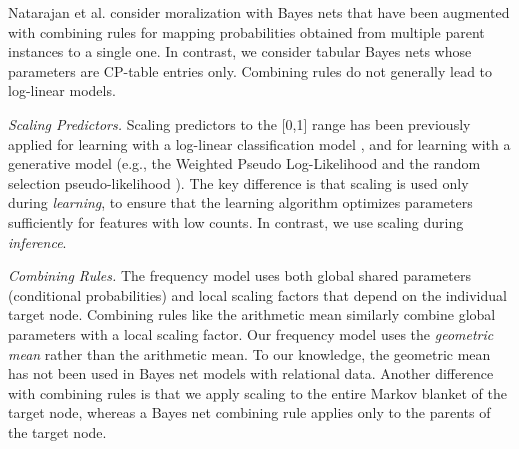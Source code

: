 \documentclass[twoside,leqno,twocolumn]{article}
\begin{document}
Natarajan et al. \cite{Natarajan2010} consider moralization with Bayes nets that have been augmented with combining rules for mapping probabilities obtained from multiple parent instances to a single one.
In contrast, we consider tabular Bayes nets whose parameters are CP-table entries only. Combining rules do not generally lead to log-linear models. 

{\em Scaling Predictors.} Scaling predictors to the [0,1] range has been previously applied for learning with a log-linear classification model \cite{Raina2003}, and for learning with a generative model (e.g., the Weighted Pseudo Log-Likelihood \cite{Domingos2009} and the random selection pseudo-likelihood \cite{Schulte2011}). 
The key difference is that scaling is used only during {\em learning}, to ensure that the learning algorithm optimizes parameters sufficiently for features with low counts. In contrast, we use scaling during {\em inference}. 

{\em Combining Rules.} The frequency model uses both global shared parameters (conditional probabilities) and local scaling factors that depend on the individual target node. Combining rules like the arithmetic mean \cite{Natarajan2010} similarly combine global parameters with a local scaling factor. Our frequency model uses the {\em geometric mean} rather than the arithmetic mean. To our knowledge, the geometric mean has not been used in Bayes net models with relational data. Another difference with combining rules is that we apply scaling to the entire Markov blanket of the target node, whereas a Bayes net combining rule applies only to the parents of the target node.
\end{document}
